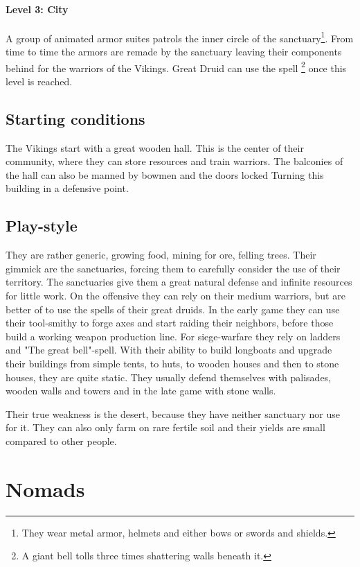 \documentclass[a4paper]{book}
\begin{document}
			\paragraph{Level 3: City}
				A group of animated armor suites patrols the inner circle of the sanctuary\footnote{
					They wear metal armor, helmets and either bows or swords and shields.
				}.
				From time to time the armors are remade by the sanctuary leaving their
				components behind for the warriors of the \gls{Vikings}.
				Great Druid can use the spell \footnote{
					A giant bell tolls three times shattering walls beneath it.
				} once this level is reached.

	\subsection{Starting conditions}
		The \gls{Vikings} start with a great wooden hall.
		This is the center of their community, where they can store resources
		and train warriors.
		The balconies of the hall can also be manned by bowmen and the doors locked
		Turning this building in a defensive point.

	\subsection{Play-style}
		They are rather generic, growing food, mining for ore, felling trees.
		Their gimmick are the sanctuaries, forcing them to carefully consider the use of their territory.
		The sanctuaries give them a great natural defense and infinite resources for little work.
		On the offensive they can rely on their medium warriors,
		but are better of to use the spells of their great druids.
		In the early game they can use their tool-smithy to forge axes and start raiding their neighbors,
		before those build a working weapon production line.
		For siege-warfare they rely on ladders and "The great bell"-spell.
		With their ability to build longboats and upgrade their buildings from simple tents,
		to huts, to wooden houses  and then to stone houses, they are quite static.
		They usually defend themselves with palisades, wooden walls and towers and in the
		late game with stone walls.

		Their true weakness is the desert, because they have neither sanctuary nor use for it.
		They can also only farm on rare fertile soil and their yields are small compared to
		other people.

\section{\Gls{Nomads}}
\end{document}
